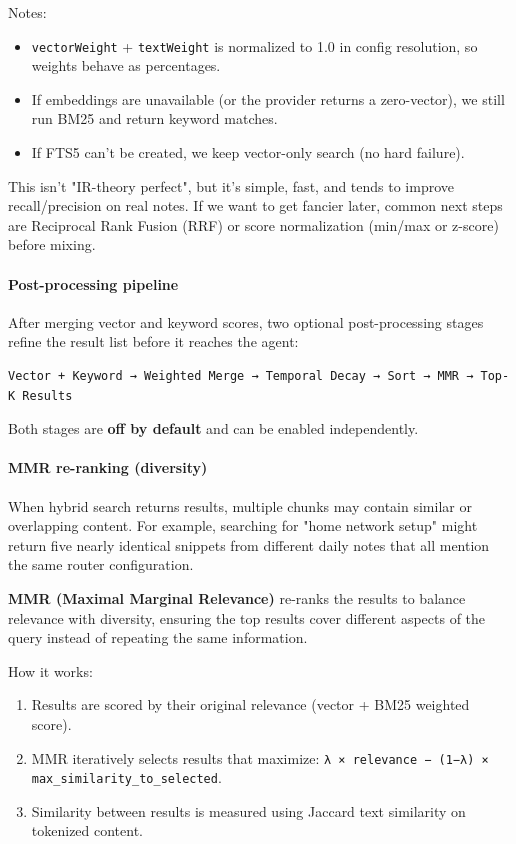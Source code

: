 Notes:

\begin{itemize}
  \item \texttt{vectorWeight} + \texttt{textWeight} is normalized to 1.0 in config resolution, so weights behave as percentages.
  \item If embeddings are unavailable (or the provider returns a zero-vector), we still run BM25 and return keyword matches.
  \item If FTS5 can't be created, we keep vector-only search (no hard failure).
\end{itemize}


This isn't "IR-theory perfect", but it's simple, fast, and tends to improve recall/precision on real notes.
If we want to get fancier later, common next steps are Reciprocal Rank Fusion (RRF) or score normalization
(min/max or z-score) before mixing.

\paragraph{Post-processing pipeline}


After merging vector and keyword scores, two optional post-processing stages
refine the result list before it reaches the agent:

\begin{lstlisting}
Vector + Keyword → Weighted Merge → Temporal Decay → Sort → MMR → Top-K Results
\end{lstlisting}


Both stages are \textbf{off by default} and can be enabled independently.

\paragraph{MMR re-ranking (diversity)}


When hybrid search returns results, multiple chunks may contain similar or overlapping content.
For example, searching for "home network setup" might return five nearly identical snippets
from different daily notes that all mention the same router configuration.

\textbf{MMR (Maximal Marginal Relevance)} re-ranks the results to balance relevance with diversity,
ensuring the top results cover different aspects of the query instead of repeating the same information.

How it works:

\begin{enumerate}
  \item Results are scored by their original relevance (vector + BM25 weighted score).
  \item MMR iteratively selects results that maximize: \texttt{λ × relevance − (1−λ) × max\_similarity\_to\_selected}.
  \item Similarity between results is measured using Jaccard text similarity on tokenized content.
\end{enumerate}


